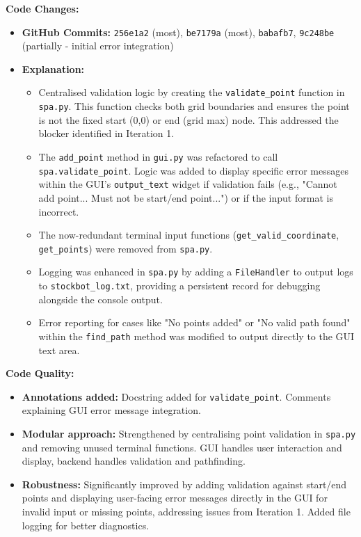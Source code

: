 \textbf{Code Changes:}
\begin{itemize}
	\item \textbf{GitHub Commits:} \verb|256e1a2| (most), \verb|be7179a| (most), \verb|babafb7|, \verb|9c248be| (partially - initial error integration)
	\item \textbf{Explanation:}
	\begin{itemize}
		\item Centralised validation logic by creating the \verb|validate_point| function in \verb|spa.py|. This function checks both grid boundaries and ensures the point is not the fixed start (0,0) or end (grid max) node. This addressed the blocker identified in Iteration 1.
		\item The \verb|add_point| method in \verb|gui.py| was refactored to call \verb|spa.validate_point|. Logic was added to display specific error messages within the GUI's \verb|output_text| widget if validation fails (e.g., "Cannot add point... Must not be start/end point...") or if the input format is incorrect.
		\item The now-redundant terminal input functions (\verb|get_valid_coordinate|, \verb|get_points|) were removed from \verb|spa.py|.
		\item Logging was enhanced in \verb|spa.py| by adding a \verb|FileHandler| to output logs to \verb|stockbot_log.txt|, providing a persistent record for debugging alongside the console output.
		\item Error reporting for cases like "No points added" or "No valid path found" within the \verb|find_path| method was modified to output directly to the GUI text area.
	\end{itemize}
\end{itemize}

\textbf{Code Quality:}
\begin{itemize}
	\item \textbf{Annotations added:} Docstring added for \verb|validate_point|. Comments explaining GUI error message integration.
	\item \textbf{Modular approach:} Strengthened by centralising point validation in \verb|spa.py| and removing unused terminal functions. GUI handles user interaction and display, backend handles validation and pathfinding.
	\item \textbf{Robustness:} Significantly improved by adding validation against start/end points and displaying user-facing error messages directly in the GUI for invalid input or missing points, addressing issues from Iteration 1. Added file logging for better diagnostics.
\end{itemize}


